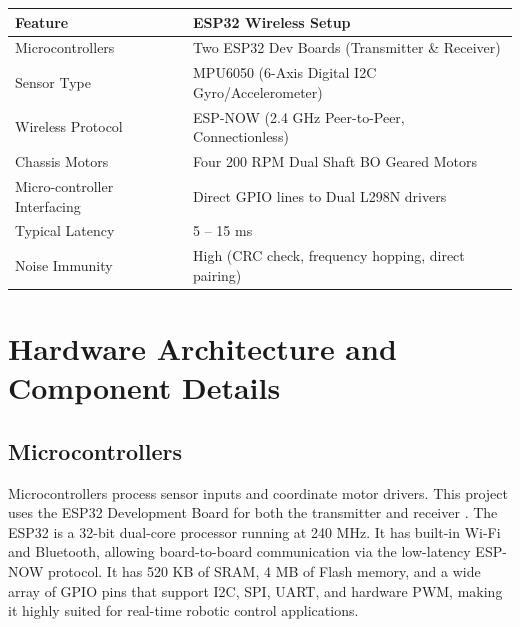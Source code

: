 \documentclass[12pt,a4paper,oneside]{report}
\begin{document}
\begin{center}
\fontsize{9.0}{10.5}\selectfont
\begin{tabular}{|C{3.2cm}|C{11.2cm}|}
\hline
\textbf{Feature} & \textbf{ESP32 Wireless Setup} \\ \hline
Microcontrollers & Two ESP32 Dev Boards (Transmitter \& Receiver) \\ \hline
Sensor Type & MPU6050 (6-Axis Digital I2C Gyro/Accelerometer) \\ \hline
Wireless Protocol & ESP-NOW (2.4 GHz Peer-to-Peer, Connectionless) \\ \hline
Chassis Motors & Four 200 RPM Dual Shaft BO Geared Motors \\ \hline
Micro-controller Interfacing & Direct GPIO lines to Dual L298N drivers \\ \hline
Typical Latency & 5 -- 15 ms \\ \hline
Noise Immunity & High (CRC check, frequency hopping, direct pairing) \\ \hline
\end{tabular}
\vspace{0.05in}
\label{tab:comparison}
\end{center}
\clearpage

\chapter{Hardware Architecture and Component Details}
\section{Microcontrollers}
Microcontrollers process sensor inputs and coordinate motor drivers. This project uses the ESP32 Development Board for both the transmitter and receiver \cite{sensor1}. The ESP32 is a 32-bit dual-core processor running at 240 MHz. It has built-in Wi-Fi and Bluetooth, allowing board-to-board communication via the low-latency ESP-NOW protocol. It has 520 KB of SRAM, 4 MB of Flash memory, and a wide array of GPIO pins that support I2C, SPI, UART, and hardware PWM, making it highly suited for real-time robotic control applications.
\end{document}
